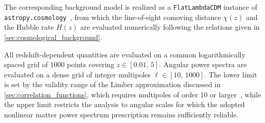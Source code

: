 The corresponding background model is realized as a
\texttt{FlatLambdaCDM} instance of \texttt{astropy.cosmology}~\cite{astropy}, from which the
line-of-sight comoving distance $\chi(z)$ and the Hubble rate $H(z)$ are evaluated numerically
following the relations given in \autoref{sec:cosmological_background}.

All redshift-dependent quantities are evaluated on a common logarithmically spaced grid of
$1000$ points covering $z\in[0.01,\,5]$. 
Angular
power spectra are evaluated on a dense grid of integer multipoles $\ell\in[10,\,1000]$. The lower
limit is set by the validity range of the Limber approximation discussed in
\autoref{sec:correlation_functions}, which requires multipoles of order 10 or larger~\cite{Limber_1953,
LoVerdeAfshordi_2008}, while the upper limit restricts the analysis to angular scales for which the 
adopted nonlinear matter power spectrum prescription remains sufficiently reliable.

